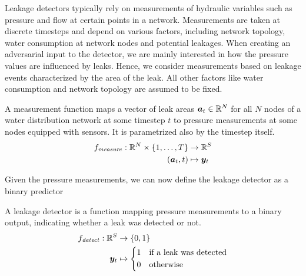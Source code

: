 Leakage detectors typically rely on measurements of hydraulic variables such
as pressure and flow at certain points in a network. Measurements are taken at
discrete timesteps and depend on various factors, including network topology,
water consumption at network nodes and potential leakages. When creating an
adversarial input to the detector, we are mainly interested in how the
pressure values are influenced by leaks. Hence, we consider measurements based
on leakage events characterized by the area of the leak. All other factors
like water consumption and network topology are assumed to be fixed.

\begin{definition}
A measurement function maps a vector of leak areas $\bm{a}_t \in \mathbb{R}^N$ for all $N$ nodes of a water distribution network at some timestep $t$ to pressure measurements at some nodes equipped with sensors. It is parametrized also by the timestep itself.
\begin{equation}
\begin{split}
f_{\mathit{measure}}: \mathbb{R}^N \times \{ 1, \hdots, T \} &\to \mathbb{R}^S\\
(\bm{a}_t, t) &\mapsto \bm{y}_t
\end{split}
\end{equation}
\end{definition}

Given the pressure measurements, we can now define the leakage detector as a
binary predictor

\begin{definition}
A leakage detector is a function mapping pressure measurements to a binary output, indicating whether a leak was detected or not.
\begin{equation}
\begin{split}
\fdetect: \mathbb{R}^S &\to \{ 0, 1 \}\\
\V{y}_t &\mapsto \begin{cases*}
1 & \text{if a leak was detected}\\
0 & \text{otherwise}
\end{cases*}
\end{split}
\end{equation}
\end{definition}
